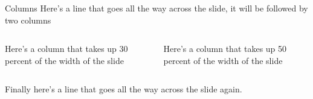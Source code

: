 \documentclass{beamer}
\begin{document}
\begin{frame}{Columns}
	Here's a line that goes all the way across the slide, it will be followed by two columns
	
	\vfill
	
	\begin{columns}
	\begin{column}{0.3\textwidth}
		Here's a column that takes up 30 percent of the width of the slide
	\end{column}
	\begin{column}{0.5\textwidth}
		Here's a column that takes up 50 percent of the width of the slide
	\end{column}
	\end{columns}
	
	\vfill
	
	Finally here's a line that goes all the way across the slide again.
\end{frame}
\end{document}
